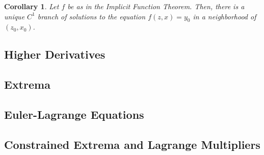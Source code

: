 \documentclass[letterpaper,twoside,12pt]{article}
\theoremstyle{mystyle}
\newtheorem{corollary}{Corollary}[theorem]
\begin{document}
  \begin{corollary}
    Let $f$ be as in the Implicit Function Theorem. Then, there is a unique $C^1$ branch of solutions to the equation $f(z, x) = y_0$ in a neighborhood of $(z_0, x_0)$. 
  \end{corollary}




\subsection{Higher Derivatives}





\subsection{Extrema}





\subsection{Euler-Lagrange Equations}





\subsection{Constrained Extrema and Lagrange Multipliers}
\end{document}
